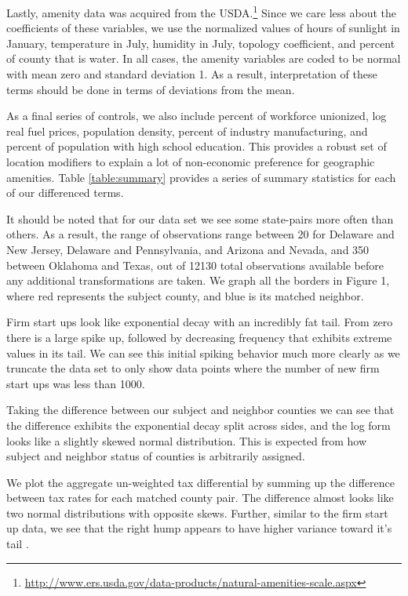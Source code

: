 Lastly, amenity data was acquired from the USDA.\footnote{\url{http://www.ers.usda.gov/data-products/natural-amenities-scale.aspx}} Since we care less about the coefficients of these variables, we use the normalized values of hours of sunlight in January, temperature in July, humidity in July, topology coefficient, and percent of county that is water. In all cases, the amenity variables are coded to be normal with mean zero and standard deviation 1. As a result, interpretation of these terms should be done in terms of deviations from the mean. 

As a final series of controls, we also include percent of workforce unionized, log real fuel prices, population density, percent of industry manufacturing, and percent of population with high school education. This provides a robust set of location modifiers to explain a lot of non-economic preference for geographic amenities. Table \ref{table:summary} provides a series of summary statistics for each of our differenced terms.

It should be noted that for our data set we see some state-pairs more often than others. As a result, the range of observations range between 20 for Delaware and New Jersey, Delaware and Pennsylvania, and Arizona and Nevada, and 350 between Oklahoma and Texas, out of 12130 total observations available before any additional transformations are taken. We graph all the borders in Figure 1, where red represents the subject county, and blue is its matched neighbor.

Firm start ups look like exponential decay with an incredibly fat tail. From zero there is a large spike up, followed by decreasing frequency that exhibits extreme values in its tail. We can see this initial spiking behavior much more clearly as we truncate the data set to only show data points where the number of new firm start ups was less than 1000.

Taking the difference between our subject and neighbor counties we can see that the difference exhibits the exponential decay split across sides, and the log form looks like a slightly skewed normal distribution. This is expected from how subject and neighbor status of counties is arbitrarily assigned.

We plot the aggregate un-weighted tax differential by summing up the difference between tax rates for each matched county pair. The difference almost looks like two normal distributions with opposite skews. Further, similar to the firm start up data, we see that the right hump appears to have higher variance toward it's tail .

